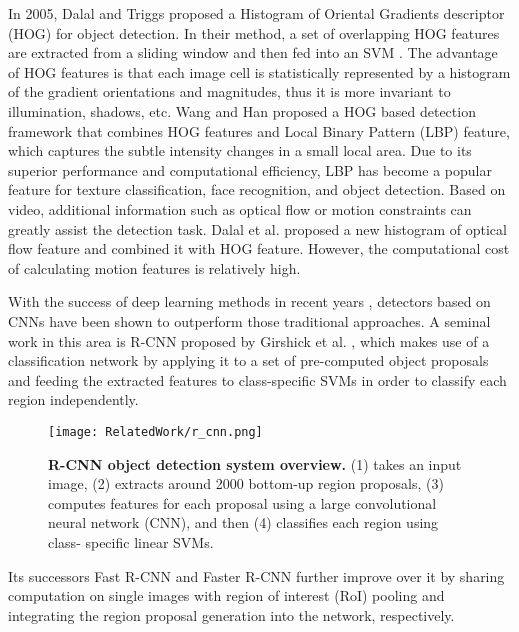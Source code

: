 In 2005, Dalal and Triggs \cite{Dalal2005} proposed a Histogram of Oriental Gradients descriptor
(HOG) for object detection. In their method, a set of overlapping HOG features are extracted from a sliding window and then fed into an SVM \cite{Cortes1995}. The advantage of HOG features is that each
image cell is statistically represented by a histogram of the gradient orientations and magnitudes,
thus it is more invariant to illumination, shadows, etc. Wang and Han \cite{wang2009} proposed a HOG based detection framework that combines HOG features and Local Binary Pattern (LBP) \cite{ahonen2006} feature, which captures the subtle intensity changes in a small local area. Due to its superior performance and computational efficiency, LBP has become a popular feature for texture classification, face recognition, and object detection. Based on video, additional information such as optical flow or motion constraints can greatly assist the detection task. Dalal et al. \cite{dala2006} proposed a new histogram of optical flow feature and combined it with HOG feature. However, the computational cost of calculating motion features is relatively high.

With the success of deep learning methods in recent years \cite{krizhevsky2012}, detectors based on CNNs have been shown to outperform those traditional approaches. A seminal work in this area is R-CNN proposed by Girshick et al. \cite{DBLP:journals/corr/GirshickDDM13}, which makes use of a classification network by applying it to a set of pre-computed object proposals and feeding the extracted features to class-specific SVMs in order to classify each region independently. 

\begin{figure}[h!]
  \centering
  \texttt{[image: RelatedWork/r\_cnn.png]}
  \caption{\textbf{R-CNN object detection system overview.} (1) takes an input image, (2) extracts
           around 2000 bottom-up region proposals, (3) computes features for each proposal using a
           large convolutional neural network (CNN), and then (4) classifies each region using class-
           specific linear SVMs. \cite{DBLP:journals/corr/GirshickDDM13}}
  \label{fig:r_cnn}
\end{figure}

Its successors Fast R-CNN \cite{DBLP:journals/corr/Girshick15} and Faster R-CNN \cite{DBLP:journals/corr/RenHG015} further improve over it by sharing computation on single images with region of interest (RoI) pooling and integrating the region proposal generation into the network, respectively. 

